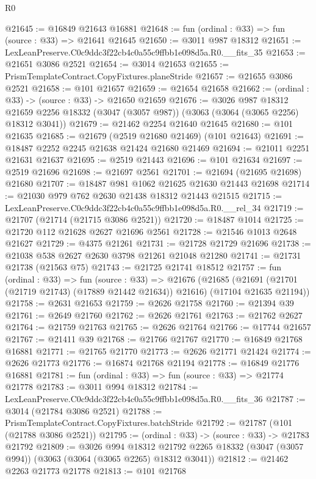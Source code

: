 \begin{lexlean}{R0}
\begin{coremodule}
@21645 := @16849 @21643 @16881
@21648 := fun (ordinal : @33) => fun (source : @33) => @21641 @21645
@21650 := @3011 @987 @18312
@21651 := LexLeanPreserve.C0c9ddc3f22cb4c0a55c9ffbb1e098d5a.R0.__fits_35
@21653 := @21651 @3086 @2521
@21654 := @3014 @21653
@21655 := PrismTemplateContract.CopyFixtures.planeStride
@21657 := @21655 @3086 @2521
@21658 := @101 @21657
@21659 := @21654 @21658
@21662 := (ordinal : @33) -> (source : @33) -> @21650 @21659
@21676 := @3026
    @987
    @18312
    @21659
    @2256
    @18332
    (@3047 (@3057 @987))
    (@3063 (@3064 (@3065 @2256) @18312 @3041))
@21679 := @21462 @2254 @21640 @21645
@21680 := @101 @21635
@21685 := @21679 (@2519 @21680 @21469) (@101 @21643)
@21691 := @18487 @2252 @2245 @21638 @21424 @21680 @21469
@21694 := @21011 @2251 @21631 @21637
@21695 := @2519 @21443
@21696 := @101 @21634
@21697 := @2519 @21696
@21698 := @21697 @2561
@21701 := @21694 (@21695 @21698) @21680
@21707 := @18487 @981 @1062 @21625 @21630 @21443 @21698
@21714 := @21030 @979 @762 @2630 @21438 @18312 @21443 @21515
@21715 := LexLeanPreserve.C0c9ddc3f22cb4c0a55c9ffbb1e098d5a.R0.__rel_34
@21719 := @21707 (@21714 (@21715 @3086 @2521))
@21720 := @18487 @1014
@21725 := @21720 @112 @21628 @2627 @21696 @2561
@21728 := @21546 @1013 @2648 @21627
@21729 := @4375 @21261
@21731 := @21728 @21729 @21696
@21738 := @21038 @538 @2627 @2630 @3798 @21261 @21048 @21280
@21741 := @21731 @21738 (@21563 @75)
@21743 := @21725 @21741 @18512
@21757 := fun (ordinal : @33) =>
  fun (source : @33) =>
  @21676
    (@21685 (@21691 (@21701 (@21719 @21743) (@17889 @21442 @21634)) @21616) (@17104 @21635 @21194))
@21758 := @2631 @21653
@21759 := @2626 @21758
@21760 := @21394 @39
@21761 := @2649 @21760
@21762 := @2626 @21761
@21763 := @21762 @2627
@21764 := @21759 @21763
@21765 := @2626 @21764
@21766 := @17744 @21657
@21767 := @21411 @39
@21768 := @21766 @21767
@21770 := @16849 @21768 @16881
@21771 := @21765 @21770
@21773 := @2626 @21771 @21424
@21774 := @2626 @21773
@21776 := @16874 @21768 @21194
@21778 := @16849 @21776 @16881
@21781 := fun (ordinal : @33) => fun (source : @33) => @21774 @21778
@21783 := @3011 @994 @18312
@21784 := LexLeanPreserve.C0c9ddc3f22cb4c0a55c9ffbb1e098d5a.R0.__fits_36
@21787 := @3014 (@21784 @3086 @2521)
@21788 := PrismTemplateContract.CopyFixtures.batchStride
@21792 := @21787 (@101 (@21788 @3086 @2521))
@21795 := (ordinal : @33) -> (source : @33) -> @21783 @21792
@21809 := @3026
    @994
    @18312
    @21792
    @2265
    @18332
    (@3047 (@3057 @994))
    (@3063 (@3064 (@3065 @2265) @18312 @3041))
@21812 := @21462 @2263 @21773 @21778
@21813 := @101 @21768

\end{coremodule}
\end{lexlean}
